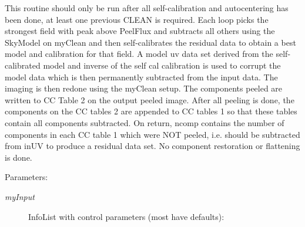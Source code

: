 This routine should only be run after all self-calibration and autocentering has been done, at least one previous CLEAN is required. Each loop picks the strongest field with peak above Peel\-Flux and subtracts all others using the Sky\-Model on my\-Clean and then self-calibrates the residual data to obtain a best model and calibration for that field. A model uv data set derived from the self-calibrated model and inverse of the self cal calibration is used to corrupt the model data which is then permanently subtracted from the input data. The imaging is then redone using the my\-Clean setup. The components peeled are written to CC Table 2 on the output peeled image. After all peeling is done, the components on the CC tables 2 are appended to CC tables 1 so that these tables contain all components subtracted. On return, ncomp contains the number of components in each CC table 1 which were NOT peeled, i.e. should be subtracted from in\-UV to produce a residual data set. No component restoration or flattening is done. \begin{Desc}
\item[Parameters:]
\begin{description}
\item[{\em my\-Input}]Info\-List with control parameters (most have defaults): \begin{itemize}

\end{itemize}
\end{description}
\end{Desc}
